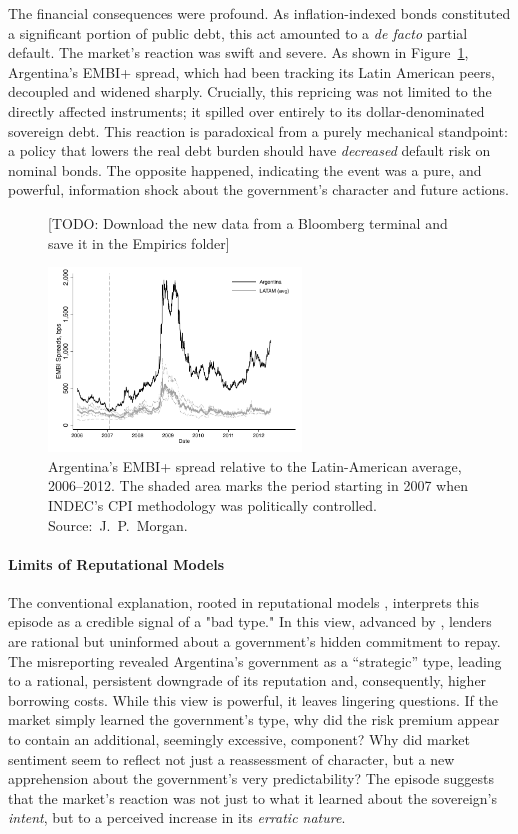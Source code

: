 \documentclass[12pt]{article}
\theoremstyle{plain}
\begin{document}
The financial consequences were profound. As inflation-indexed bonds
constituted a significant portion of public debt, this act amounted to a
\textit{de facto} partial default. The market's reaction was swift and severe.
As shown in Figure~\ref{fig:argentina_spreads}, Argentina's EMBI+ spread, which
had been tracking its Latin American peers, decoupled and widened sharply.
Crucially, this repricing was not limited to the directly affected instruments;
it spilled over entirely to its dollar-denominated sovereign debt. This
reaction is paradoxical from a purely mechanical standpoint: a policy that
lowers the real debt burden should have \textit{decreased} default risk on
nominal bonds. The opposite happened, indicating the event was a pure, and
powerful, information shock about the government's character and future
actions.

\begin{figure}[htbp]
	\centering
	{\color{red}[TODO: Download the new data from a Bloomberg terminal and save it in the Empirics folder]}

	\includegraphics[width=0.6\textwidth]{../../long_term/Empirics/Results/Figure_EMBI_LATAM.pdf}
	\caption{Argentina's EMBI+ spread relative to the Latin-American average,
		2006–2012.  The shaded area marks the period starting in 2007 when INDEC's CPI
		methodology was politically controlled.
		Source:~J.~P.~Morgan.}
	\label{fig:argentina_spreads}
\end{figure}

\paragraph{Limits of Reputational Models}
The conventional explanation, rooted in reputational models
\citep{ColeDowEnglish1995}, interprets this episode as a credible signal of a
"bad type." In this view, advanced by \citep{MorelliMoretti2023}, lenders are
rational but uninformed about a government's hidden commitment to repay. The
misreporting revealed Argentina's government as a ``strategic'' type, leading
to a rational, persistent downgrade of its reputation and, consequently, higher
borrowing costs. While this view is powerful, it leaves lingering questions. If
the market simply learned the government's type, why did the risk premium
appear to contain an additional, seemingly excessive, component? Why did market
sentiment seem to reflect not just a reassessment of character, but a new
apprehension about the government's very predictability? The episode suggests
that the market's reaction was not just to what it learned about the
sovereign's \textit{intent}, but to a perceived increase in its \textit{erratic
	nature}.
\end{document}
